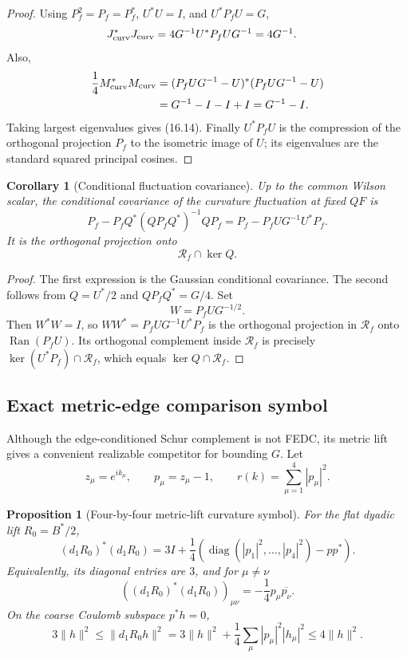 \documentclass[11pt,oneside]{book}
\newtheorem{proposition}[theorem]{Proposition}
\newtheorem{corollary}[theorem]{Corollary}
\theoremstyle{definition}
\theoremstyle{remark}
\begin{document}
\begin{proof}
Using \(P_f^2=P_f=P_f^*\), \(U^*U=I\), and \(U^*P_fU=G\),
\[
\begin{split}
J_{\rm curv}^*J_{\rm curv}
 &=4G^{-1}U^*P_fUG^{-1}=4G^{-1}.
\end{split}
\]
Also,
\[
\begin{split}
\frac14M_{\rm curv}^*M_{\rm curv}
={}&(P_fUG^{-1}-U)^*(P_fUG^{-1}-U)\\
={}&G^{-1}-I-I+I=G^{-1}-I.
\end{split}
\]
Taking largest eigenvalues gives (16.14).  Finally \(U^*P_fU\) is the
compression of the orthogonal projection \(P_f\) to the isometric
image of \(U\); its eigenvalues are the standard squared principal
cosines.
\end{proof}

\begin{corollary}[Conditional fluctuation covariance]
\label{cor:e8v16-covariance}
Up to the common Wilson scalar, the conditional covariance of the
curvature fluctuation at fixed \(QF\) is
\[
 P_f-P_fQ^*(QP_fQ^*)^{-1}QP_f
 =P_f-P_fUG^{-1}U^*P_f.                            \tag{16.15}
\]
It is the orthogonal projection onto
\[
                  \mathcal R_f\cap\ker Q.
\]
\end{corollary}

\begin{proof}
The first expression is the Gaussian conditional covariance.  The
second follows from \(Q=U^*/2\) and \(QP_fQ^*=G/4\).  Set
\[
 W=P_fUG^{-1/2}.
\]
Then \(W^*W=I\), so \(WW^*=P_fUG^{-1}U^*P_f\) is the orthogonal
projection in \(\mathcal R_f\) onto
\(\operatorname{Ran}(P_fU)\).  Its orthogonal complement inside
\(\mathcal R_f\) is precisely \(\ker(U^*P_f)\cap\mathcal R_f\),
which equals \(\ker Q\cap\mathcal R_f\).
\end{proof}

\subsection{Exact metric-edge comparison symbol}

Although the edge-conditioned Schur complement is not FEDC, its
metric lift gives a convenient realizable competitor for bounding
\(G\).  Let
\[
 z_\mu=e^{ik_\mu},\qquad p_\mu=z_\mu-1,\qquad
 r(k)=\sum_{\mu=1}^4|p_\mu|^2.                                    \tag{16.16}
\]

\begin{proposition}[Four-by-four metric-lift curvature symbol]
\label{prop:e8v16-metric-symbol}
For the flat dyadic lift \(R_0=B^*/2\),
\[
\boxed{\quad
 (d_1R_0)^*(d_1R_0)
 =3I+\frac14\left(
       \operatorname{diag}(|p_1|^2,\ldots,|p_4|^2)-pp^*
             \right).
\quad}                                                            \tag{16.17}
\]
Equivalently, its diagonal entries are \(3\), and for \(\mu\ne\nu\)
\[
 \left((d_1R_0)^*(d_1R_0)\right)_{\mu\nu}
 =-\frac14p_\mu\overline{p_\nu}.                                  \tag{16.18}
\]
On the coarse Coulomb subspace \(p^*h=0\),
\[
 3\|h\|^2
 \leq\|d_1R_0h\|^2
 =3\|h\|^2+\frac14\sum_\mu|p_\mu|^2|h_\mu|^2
 \leq4\|h\|^2.                                                     \tag{16.19}
\]
\end{proposition}
\end{document}
